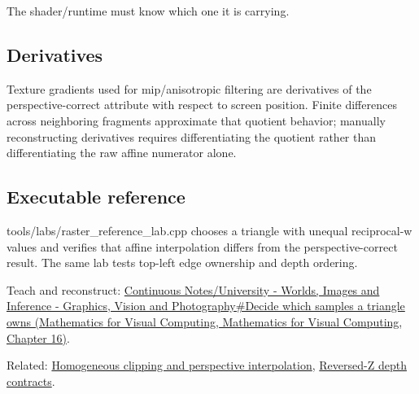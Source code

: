 The shader/runtime must know which one it is carrying.

\subsection{Derivatives}\label{appendix-1ed5f96c73ea-derivatives}

Texture gradients used for mip/anisotropic filtering are derivatives of the perspective-correct attribute with respect to screen position. Finite differences across neighboring fragments approximate that quotient behavior; manually reconstructing derivatives requires differentiating the quotient rather than differentiating the raw affine numerator alone.

\subsection{Executable reference}\label{appendix-1ed5f96c73ea-executable-reference}

tools/labs/raster\_reference\_lab.cpp chooses a triangle with unequal reciprocal-w values and verifies that affine interpolation differs from the perspective-correct result. The same lab tests top-left edge ownership and depth ordering.

Teach and reconstruct: \href{../02-Mathematics-for-Visual-Computing/main.pdf\#nameddest=03-visual-computing-i-ch012-decide-which-samples-a-triangle-owns}{Continuous Notes/University - Worlds, Images and Inference - Graphics, Vision and Photography\#Decide which samples a triangle owns (Mathematics for Visual Computing, Mathematics for Visual Computing, Chapter 16)}.

Related: \hyperref[appendix-40426e4b2103]{Homogeneous clipping and perspective interpolation}, \hyperref[appendix-275ec8847057]{Reversed-Z depth contracts}.
